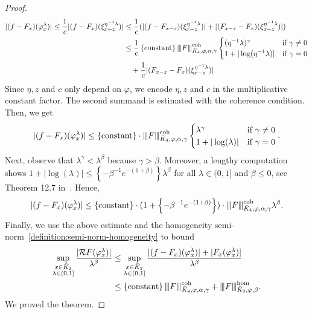 \begin{proof}
  \begin{align*}
    |(f - F_x)(\varphi^\lambda_x)| \leq \frac{1}{c}|(f - F_x)(\xi^{\eta^{-1}\lambda}_{x - z})| &\leq \frac{1}{c}(|(f - F_{x- z})(\xi^{\eta^{-1}\lambda}_{x - z})| + |(F_{x -z} - F_x)(\xi^{\eta^{-1}\lambda}_{x - z})|) \\
    &\leq \frac{1}{c}\left\{ \mathrm{constant} \right\} {\left\vert\kern-0.25ex\left\vert\kern-0.25ex\left\vert F \right\vert\kern-0.25ex\right\vert\kern-0.25ex\right\vert}^{\mathrm{coh}}_{\bar{K}_{4}, \varphi, \alpha, \gamma} \begin{cases}
      (\eta^{-1}\lambda)^\gamma  \quad &\text{if \( \gamma \neq 0 \)}\\
      1 + |\log(\eta^{-1}\lambda)| & \text{if \( \gamma = 0 \)}
    \end{cases} \\ 
     &\hspace{1em}+ \frac{1}{c}|(F_{x -z} - F_x)(\xi^{\eta^{-1}\lambda}_{x - z})|
  \end{align*}
  Since \( \eta, z \) and \( c \) only depend on \( \varphi \), we encode \( \eta, z \) and \( c \) in the multiplicative constant factor. The second summand is estimated with the coherence condition. Then, we get
  \begin{align*}
    |(f - F_x)(\varphi^\lambda_x)| \leq \left\{ \mathrm{constant} \right\} \cdot {\left\vert\kern-0.25ex\left\vert\kern-0.25ex\left\vert F \right\vert\kern-0.25ex\right\vert\kern-0.25ex\right\vert}^{\mathrm{coh}}_{\bar{K}_{4}, \varphi, \alpha, \gamma}\begin{cases}
      \lambda^\gamma  \quad &\text{if \( \gamma \neq 0 \)}\\
      1 + |\log(\lambda)| & \text{if \( \gamma = 0 \)}
    \end{cases}.
  \end{align*}
  Next, observe that \( \lambda^\gamma < \lambda^\beta \) because \( \gamma > \beta \). Moreover, a lengthy computation shows \( 1 + |\log(\lambda)| \leq \left\{ -\beta^{-1}e^{-(1 + \beta)} \right\}\lambda^\beta \) for all \( \lambda \in (0,1] \) and \( \beta \leq 0 \), see Theorem 12.7 in~\cite{caravenna2021hairer}. Hence,
  \begin{align*}
    |(f - F_x)(\varphi^\lambda_x)| \leq \left\{ \mathrm{constant} \right\} \cdot (1 + \left\{ -\beta^{-1}e^{-(1 + \beta)}\right \}) \cdot {\left\vert\kern-0.25ex\left\vert\kern-0.25ex\left\vert F \right\vert\kern-0.25ex\right\vert\kern-0.25ex\right\vert}^{\mathrm{coh}}_{\bar{K}_{4}, \varphi, \alpha, \gamma}  \lambda^\beta.
  \end{align*}
  Finally, we use the above estimate and the homogeneity semi-norm~\eqref{definition:semi-norm-homogeneity} to bound
  \begin{align*}
    \sup_{\substack{x \in \bar{K}_{2} \\ \lambda \in (0,1]}} 
    \frac{|\mathcal{R}F(\varphi^{\lambda}_x)|}{\lambda^\beta} 
    &\leq 
    \sup_{\substack{x \in \bar{K}_{2} \\ \lambda \in (0,1]}} 
    \frac{|(f - F_x)(\varphi^{\lambda}_x)| + |F_x(\varphi^\lambda_x)|}{\lambda^\beta} \\
    &\leq \left\{ \mathrm{constant} \right\} {\left\vert\kern-0.25ex\left\vert\kern-0.25ex\left\vert F \right\vert\kern-0.25ex\right\vert\kern-0.25ex\right\vert}^{\mathrm{coh}}_{\bar{K}_{4}, \varphi, \alpha, \gamma} + {\left\vert\kern-0.25ex\left\vert\kern-0.25ex\left\vert F \right\vert\kern-0.25ex\right\vert\kern-0.25ex\right\vert}^{\mathrm{\hom}}_{\bar{K}_{2}, \varphi, \beta} .
  \end{align*}
  We proved the theorem.
\end{proof}

